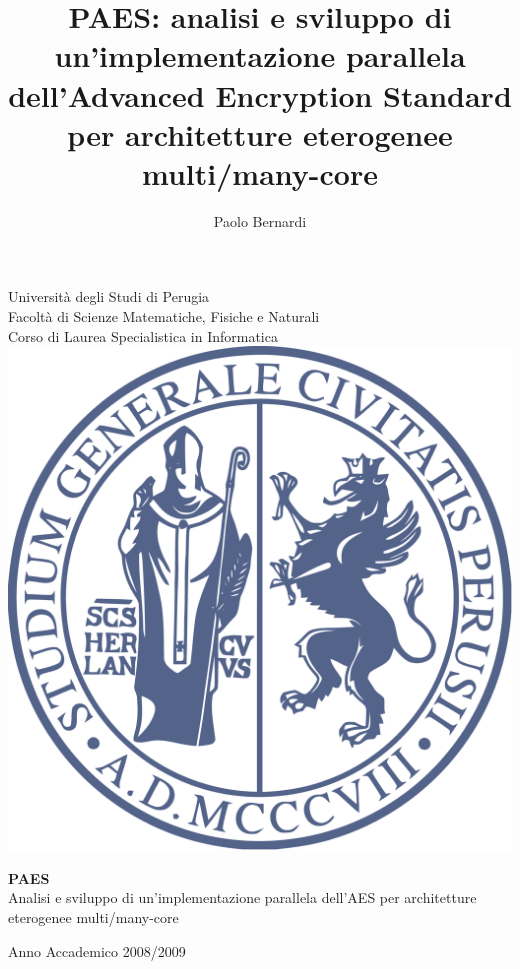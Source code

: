 \documentclass[12pt,a4paper,oneside]{book}
\author{Paolo Bernardi}
\title{PAES: analisi e sviluppo di un'implementazione parallela dell'Advanced Encryption Standard per architetture eterogenee multi/many-core}
\begin{document}
\setlength{\parindent}{0pt}
\setlength{\parskip}{1ex plus 0.5ex minus 0.2ex}
\setlength{\unitlength}{1cm}

\begin{titlepage}
\begin{center}

{\Large \sc Università  degli Studi di Perugia} \\
{\large
\vspace*{0.3 cm}
Facoltà  di Scienze Matematiche, Fisiche e Naturali \\
\vspace*{0.5 cm}
Corso di Laurea Specialistica in Informatica} \\

\vspace*{1.8 cm}
\includegraphics[scale=0.25]{img/unipg.pdf} \\
\vspace*{1.8 cm}
        
{\Large {\bf PAES}} \\
\vspace*{0.5 cm}
{\large Analisi e sviluppo di un'implementazione parallela 
dell'AES per architetture eterogenee multi/many-core}
\vspace*{1.5 cm}      

\large {}

\vspace{1.7 cm}
Anno Accademico 2008/2009

\end{center}
\end{titlepage}
\end{document}
